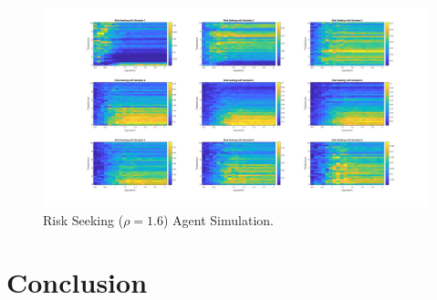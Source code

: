 \documentclass[apa]{article}
\begin{document}
\begin{figure}
\centering
\includegraphics[width=\textwidth]{RiskSeeking.jpg}
\caption{Risk Seeking ($\rho = 1.6$) Agent Simulation.}
\label{fig:universe}
\end{figure}


\section{Conclusion}



\end{document}
